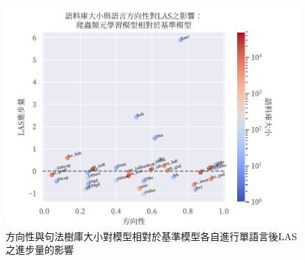 \begin{figure}[h]
    \centering
    \includegraphics{figs/chapter3/dir_size_las_ft_reptile-to-multi.pdf}
    \caption{方向性與句法樹庫大小對\reptile 模型相對於基準模型各自進行單語言\finetune 後LAS之進步量的影響}
    \label{fig:dir-size-las-ft-reptile-to-multi}
\end{figure}